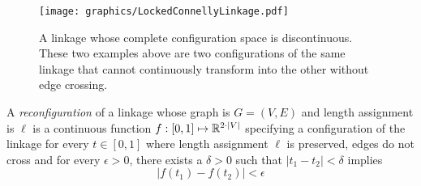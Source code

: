 \begin{figure}[!h]
\begin{center}
\texttt{[image: graphics/LockedConnellyLinkage.pdf]}
\end{center} 
\caption{A linkage whose complete configuration space is discontinuous.  These two examples above 
are two configurations of the same linkage that cannot continuously transform into the other 
without edge crossing.}
\label{fig:configuration-4}
\end{figure}
A \textit{reconfiguration} of a linkage whose graph is $G=(V,E)$ and length assignment is $\ell$ is 
a continuous function $f: [0,1] \mapsto {\mathbb{R}}^{2 \cdot \vert V \vert}$ specifying a configuration of 
the linkage for every $t \in [0,1]$ where length assignment $\ell$ is preserved, edges do not cross 
and for every $\epsilon > 0$, there exists a $\delta > 0$ such that $\vert t_1 - t_2 \vert < 
\delta$ implies 
$$\left\vert f\left( t_1 \right) - f\left( t_2 \right) \right\vert < \epsilon$$




